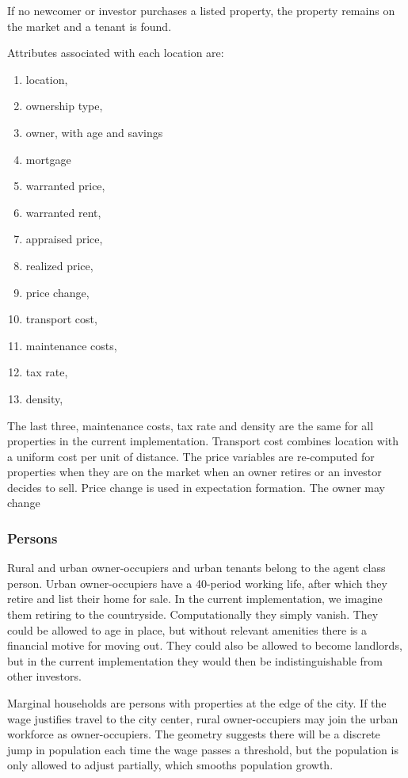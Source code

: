 If no newcomer or investor purchases a listed property, the property  remains on the market and a tenant is found. 

Attributes associated with each location are:
\begin{enumerate}
    \item location,
    \item ownership type, 
    \item owner, with age and savings
    \item mortgage
    \item warranted price, 
    \item warranted rent, 
    \item appraised price, 
    \item realized price,
    \item price  change, 
    \item transport cost, 
    \item maintenance costs,
    \item tax rate,  
    \item density, 
\end{enumerate}
The last three,  maintenance costs, tax rate and density are the same for all properties in the current implementation. Transport cost combines location with a uniform cost per unit of distance.  The price variables are re-computed for properties when they are on the market when an owner retires or an investor decides to sell. Price change is used in expectation formation. The owner may change


\subsubsection{Persons}
Rural and urban owner-occupiers and urban tenants belong to the agent class person. Urban owner-occupiers have a 40-period working life, after which they retire and list their home for sale.  In the current implementation, we imagine them retiring to the countryside. Computationally they simply vanish. They could be allowed to age in place, but without relevant amenities there is a financial motive for moving out. They could also be allowed to become landlords, but in the current implementation they would then be indistinguishable from other investors.

Marginal households are persons with properties at the edge of the city.  If the wage justifies travel to the city center, rural owner-occupiers may join the urban workforce as owner-occupiers. The geometry suggests there will be a discrete jump in population each time the wage passes a threshold, but the population is only allowed to adjust partially, which smooths population growth.

